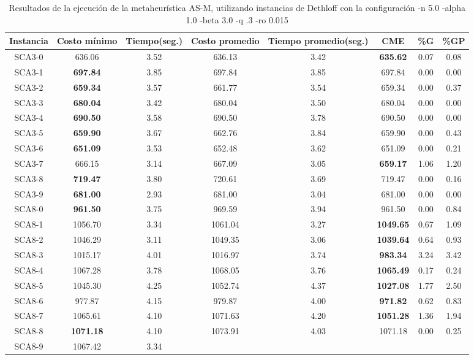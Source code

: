 \begin{table}[h]
\caption{Resultados de la ejecución de la metaheurística AS-M, utilizando instancias de Dethloff con la configuración -n 5.0 -alpha 1.0 -beta 3.0 -q .3 -ro 0.015}
\centering
\small
\begin{tabular}{c c c c c c c c}
\hline\hline
Instancia & Costo mínimo & Tiempo(seg.) & Costo promedio & Tiempo promedio(seg.) & CME & \%G & \%GP \\ [0.5ex]
\hline
SCA3-0 & 636.06 & 3.52 & 
636.13 & 3.42 & \bf{635.62} & 
0.07 & 0.08\\SCA3-1 & \bf{697.84} & 3.85 & 
697.84 & 3.85 & 697.84 & 0.00
 & 0.00\\
SCA3-2 & \bf{659.34} & 3.57 & 
661.77 & 3.54 & 659.34 & 0.00
 & 0.37\\SCA3-3 & \bf{680.04} & 3.42 & 
680.04 & 3.50 & 680.04 & 0.00
 & 0.00\\
SCA3-4 & \bf{690.50} & 3.58 & 
690.50 & 3.78 & 690.50 & 0.00
 & 0.00\\
SCA3-5 & \bf{659.90} & 3.67 & 
662.76 & 3.84 & 659.90 & 0.00
 & 0.43\\SCA3-6 & \bf{651.09} & 3.53 & 
652.48 & 3.62 & 651.09 & 0.00
 & 0.21\\SCA3-7 & 666.15 & 3.14 & 
667.09 & 3.05 & \bf{659.17} & 
1.06 & 1.20\\SCA3-8 & \bf{719.47} & 3.80 & 
720.61 & 3.69 & 719.47 & 0.00
 & 0.16\\SCA3-9 & \bf{681.00} & 2.93 & 
681.00 & 3.04 & 681.00 & 0.00
 & 0.00\\
SCA8-0 & \bf{961.50} & 3.75 & 
969.59 & 3.94 & 961.50 & 0.00
 & 0.84\\SCA8-1 & 1056.70 & 3.34 & 
1061.04 & 3.27 & \bf{1049.65} & 
0.67 & 1.09\\SCA8-2 & 1046.29 & 3.11 & 
1049.35 & 3.06 & \bf{1039.64} & 
0.64 & 0.93\\SCA8-3 & 1015.17 & 4.01 & 
1016.97 & 3.74 & \bf{983.34} & 
3.24 & 3.42\\SCA8-4 & 1067.28 & 3.78 & 
1068.05 & 3.76 & \bf{1065.49} & 
0.17 & 0.24\\SCA8-5 & 1045.30 & 4.25 & 
1052.74 & 4.37 & \bf{1027.08} & 
1.77 & 2.50\\SCA8-6 & 977.87 & 4.15 & 
979.87 & 4.00 & \bf{971.82} & 
0.62 & 0.83\\SCA8-7 & 1065.61 & 4.10 & 
1071.63 & 4.20 & \bf{1051.28} & 
1.36 & 1.94\\SCA8-8 & \bf{1071.18} & 4.10 & 
1073.91 & 4.03 & 1071.18 & 0.00
 & 0.25\\SCA8-9 & 1067.42 & 3.34 & 

\end{tabular}
\end{table}
